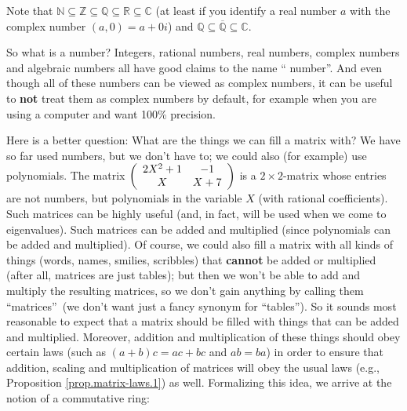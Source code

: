 \documentclass[numbers=enddot,12pt,final,onecolumn,notitlepage]{scrartcl}%
\theoremstyle{definition}
\begin{document}
Note that $\mathbb{N}\subseteq\mathbb{Z}\subseteq\mathbb{Q}\subseteq
\mathbb{R}\subseteq\mathbb{C}$ (at least if you identify a real number $a$
with the complex number $\left(  a,0\right)  =a+0i$) and $\mathbb{Q}%
\subseteq\overline{\mathbb{Q}}\subseteq\mathbb{C}$.

So what is a number? Integers, rational numbers, real numbers, complex numbers
and algebraic numbers all have good claims to the name \textquotedblleft
number\textquotedblright. And even though all of these numbers can be viewed
as complex numbers, it can be useful to \textbf{not} treat them as complex
numbers by default, for example when you are using a computer and want 100\% precision.

Here is a better question: What are the things we can fill a matrix with? We
have so far used numbers, but we don't have to; we could also (for example)
use polynomials. The matrix $\left(
\begin{array}
[c]{cc}%
2X^{2}+1 & -1\\
X & X+7
\end{array}
\right)  $ is a $2\times2$-matrix whose entries are not numbers, but
polynomials in the variable $X$ (with rational coefficients). Such matrices
can be highly useful (and, in fact, will be used when we come to eigenvalues).
Such matrices can be added and multiplied (since polynomials can be added and
multiplied). Of course, we could also fill a matrix with all kinds of things
(words, names, smilies, scribbles) that \textbf{cannot} be added or multiplied
(after all, matrices are just tables); but then we won't be able to add and
multiply the resulting matrices, so we don't gain anything by calling them
\textquotedblleft matrices\textquotedblright\ (we don't want just a fancy
synonym for \textquotedblleft tables\textquotedblright). So it sounds most
reasonable to expect that a matrix should be filled with things that can be
added and multiplied. Moreover, addition and multiplication of these things
should obey certain laws (such as $\left(  a+b\right)  c=ac+bc$ and $ab=ba$)
in order to ensure that addition, scaling and multiplication of matrices will
obey the usual laws (e.g., Proposition \ref{prop.matrix-laws.1}) as well.
Formalizing this idea, we arrive at the notion of a commutative ring:
\end{document}
